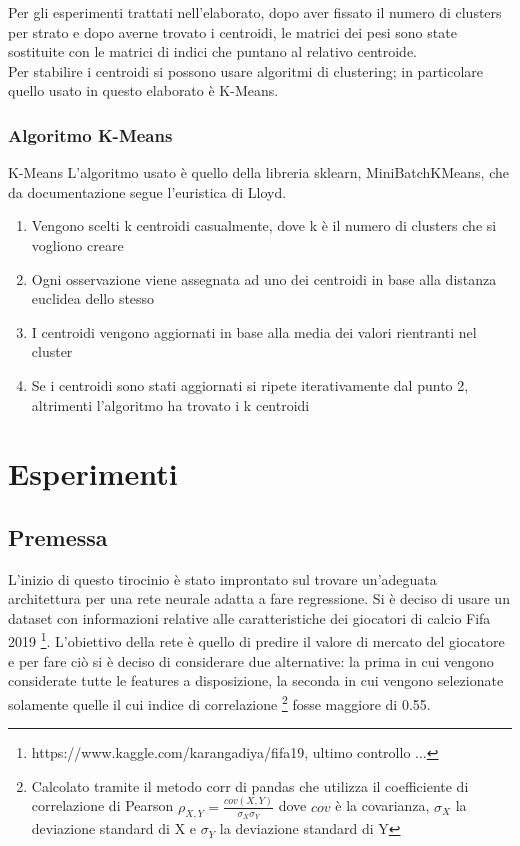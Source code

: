 \documentclass[12pt]{report}
\begin{document}
Per gli esperimenti trattati nell'elaborato, dopo aver fissato il numero di clusters per strato e dopo averne trovato i centroidi, le matrici dei pesi sono state sostituite con le matrici di indici che puntano al relativo centroide. \\
Per stabilire i centroidi si possono usare algoritmi di clustering; in particolare quello usato in questo elaborato è K-Means. 

\subsection{Algoritmo K-Means}
K-Means
L’algoritmo usato è quello della libreria sklearn, MiniBatchKMeans, che da documentazione segue l’euristica di Lloyd.

\begin{enumerate}
\item{Vengono scelti k centroidi casualmente, dove k è il numero di clusters che si vogliono creare}
\item{Ogni osservazione viene assegnata ad uno dei centroidi in base alla distanza euclidea dello stesso}
\item{I centroidi vengono aggiornati in base alla media dei valori rientranti nel cluster}
\item{Se i centroidi sono stati aggiornati si ripete iterativamente dal punto 2, altrimenti l’algoritmo ha trovato i k centroidi}
\end{enumerate}
 

\chapter{Esperimenti}

\section{Premessa}

L’inizio di questo tirocinio è stato improntato sul trovare un’adeguata architettura per una rete neurale adatta a fare regressione. Si è deciso di usare un dataset con informazioni relative alle caratteristiche dei giocatori di calcio Fifa 2019 \footnote{https://www.kaggle.com/karangadiya/fifa19, ultimo controllo ...}. L’obiettivo della rete è quello di predire il valore di mercato del giocatore e per fare ciò si è deciso di considerare due alternative: la prima in cui vengono considerate tutte le features a disposizione, la seconda in cui vengono selezionate solamente quelle il cui indice di correlazione \footnote{Calcolato tramite il metodo corr di pandas che utilizza il coefficiente di correlazione di Pearson $\rho_{X,Y} = \frac{cov(X, Y)}{\sigma_X\sigma_Y}$ dove $cov$ è la covarianza, $\sigma_X$ la deviazione standard di X e $\sigma_Y$ la deviazione standard di Y} fosse maggiore di 0.55.
\end{document}

